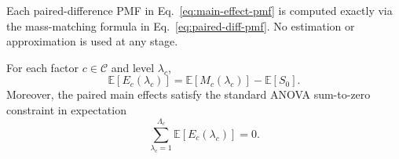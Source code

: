 Each paired-difference PMF in Eq.~\eqref{eq:main-effect-pmf} is computed exactly
via the mass-matching formula in Eq.~\eqref{eq:paired-diff-pmf}. 
No estimation or approximation is used at any stage.

\begin{corollary}
\label{cor:main-effect-anova}
For each factor $c\in\mathcal{C}$ and level $\lambda_c$,
\begin{equation}
\label{eq:main-effect-expectation}
\mathbb{E}\!\left[E_c(\lambda_c)\right]
=
\mathbb{E}\!\left[M_c(\lambda_c)\right]
-
\mathbb{E}\!\left[S_0\right].
\end{equation}
Moreover, the paired main effects satisfy the standard ANOVA sum-to-zero
constraint in expectation
\begin{equation}
\label{eq:main-effect-sum-to-zero}
\sum_{\lambda_c=1}^{\Lambda_c}\mathbb{E}\!\left[E_c(\lambda_c)\right] = 0.
\end{equation}
\end{corollary}

